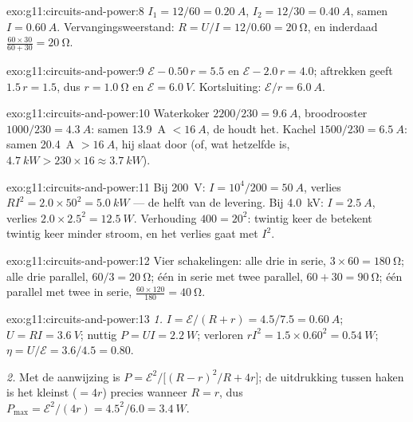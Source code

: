 \begin{solution}{exo:g11:circuits-and-power:8}
$I_1 = 12/60 = \qty{0.20}{A}$, $I_2 = 12/30 = \qty{0.40}{A}$, samen
$I = \qty{0.60}{A}$. Vervangingsweerstand: $R = U/I = 12/0.60 =
\qty{20}{\ohm}$, en inderdaad $\frac{60 \times 30}{60 + 30} =
\qty{20}{\ohm}$.
\end{solution}

\begin{solution}{exo:g11:circuits-and-power:9}
$\mathcal{E} - 0.50\,r = 5.5$ en $\mathcal{E} - 2.0\,r = 4.0$; aftrekken
geeft $1.5\,r = 1.5$, dus $r = \qty{1.0}{\ohm}$ en
$\mathcal{E} = \qty{6.0}{V}$. Kortsluiting: $\mathcal{E}/r =
\qty{6.0}{A}$.
\end{solution}

\begin{solution}{exo:g11:circuits-and-power:10}
Waterkoker $2200/230 = \qty{9.6}{A}$, broodrooster $1000/230 =
\qty{4.3}{A}$: samen \qty{13.9}{A} $< \qty{16}{A}$, de  houdt
het. Kachel $1500/230 = \qty{6.5}{A}$: samen \qty{20.4}{A} $>
\qty{16}{A}$, hij slaat door (of, wat hetzelfde is,
$\qty{4.7}{kW} > 230 \times 16 \approx \qty{3.7}{kW}$).
\end{solution}

\begin{solution}{exo:g11:circuits-and-power:11}
Bij \qty{200}{V}: $I = 10^4/200 = \qty{50}{A}$, verlies
$RI^2 = 2.0 \times 50^2 = \qty{5.0}{kW}$ --- de helft van de levering.
Bij \qty{4.0}{kV}: $I = \qty{2.5}{A}$, verlies
$2.0 \times 2.5^2 = \qty{12.5}{W}$. Verhouding $400 = 20^2$: twintig keer
de  betekent twintig keer minder stroom, en het verlies gaat met
$I^2$.
\end{solution}

\begin{solution}{exo:g11:circuits-and-power:12}
Vier schakelingen: alle drie in serie, $3 \times 60 = \qty{180}{\ohm}$;
alle drie parallel, $60/3 = \qty{20}{\ohm}$; één in serie met twee
parallel, $60 + 30 = \qty{90}{\ohm}$; één parallel met twee in serie,
$\frac{60 \times 120}{180} = \qty{40}{\ohm}$.
\end{solution}

\begin{solution}{exo:g11:circuits-and-power:13}
\emph{1.} $I = \mathcal{E}/(R + r) = 4.5/7.5 = \qty{0.60}{A}$;
$U = RI = \qty{3.6}{V}$; nuttig $P = UI = \qty{2.2}{W}$; verloren
$rI^2 = 1.5 \times 0.60^2 = \qty{0.54}{W}$; $\eta = U/\mathcal{E} =
3.6/4.5 = 0.80$.

\emph{2.} Met de aanwijzing is $P = \mathcal{E}^2 \big/ \big[(R - r)^2/R
+ 4r\big]$; de uitdrukking tussen haken is het kleinst ($= 4r$) precies
wanneer $R = r$, dus $P_{\max} = \mathcal{E}^2/(4r) = 4.5^2/6.0 =
\qty{3.4}{W}$.
\end{solution}

